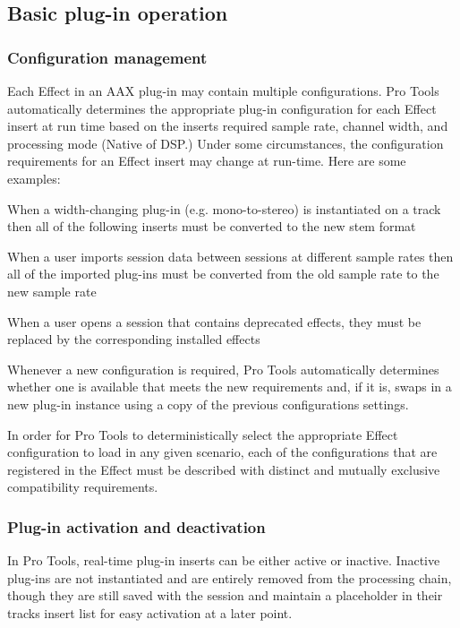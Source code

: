  \hypertarget{a00360_aax_pro_tools_guide_04_basic_plugin_operation}{}\subsection{Basic plug-\/in operation}\label{a00360_aax_pro_tools_guide_04_basic_plugin_operation}
\hypertarget{a00360_subsection__configuration_management}{}\subsubsection{Configuration management}\label{a00360_subsection__configuration_management}
Each Effect in an A\+A\+X plug-\/in may contain multiple configurations. Pro Tools automatically determines the appropriate plug-\/in configuration for each Effect insert at run time based on the insert\textquotesingle{}s required sample rate, channel width, and processing mode (Native of D\+S\+P.) Under some circumstances, the configuration requirements for an Effect insert may change at run-\/time. Here are some examples\+: 
\begin{DoxyItemize}
\item When a width-\/changing plug-\/in (e.\+g. mono-\/to-\/stereo) is instantiated on a track then all of the following inserts must be converted to the new stem format  
\item When a user imports session data between sessions at different sample rates then all of the imported plug-\/ins must be converted from the old sample rate to the new sample rate  
\item When a user opens a session that contains deprecated effects, they must be replaced by the corresponding installed effects  
\end{DoxyItemize}

Whenever a new configuration is required, Pro Tools automatically determines whether one is available that meets the new requirements and, if it is, swaps in a new plug-\/in instance using a copy of the previous configuration\textquotesingle{}s settings.

In order for Pro Tools to deterministically select the appropriate Effect configuration to load in any given scenario, each of the configurations that are registered in the Effect must be described with distinct and mutually exclusive compatibility requirements.

\hypertarget{a00360_subsection__plugin_activation_and_deactivation}{}\subsubsection{Plug-\/in activation and deactivation}\label{a00360_subsection__plugin_activation_and_deactivation}
 In Pro Tools, real-\/time plug-\/in inserts can be either active or inactive. Inactive plug-\/ins are not instantiated and are entirely removed from the processing chain, though they are still saved with the session and maintain a placeholder in their track\textquotesingle{}s insert list for easy activation at a later point.

